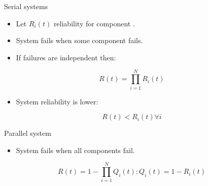 \begin{frame}[t]{Serial systems}
\begin{itemize}
  \item Let $R_i(t)$ reliability for component .
  \item System fails when some component fails.
\end{itemize}
\begin{center}

\end{center}
\begin{itemize}
  \item If failures are independent then:
\end{itemize}
\begin{equation*}
R(t) = \prod_{i=1}^{N} R_i(t)
\end{equation*}
\begin{itemize}
  \item System reliability is lower:
\end{itemize}
\begin{equation*}
R(t) < R_i(t) \forall i
\end{equation*}
\end{frame}

\begin{frame}[t]{Parallel system}
\begin{itemize}
  \item System fails when all components fail.
\end{itemize}
\begin{equation*}
R(t) = 1 - \prod_{i=1}^N Q_i(t) : Q_i(t) = 1 - R_i(t)
\end{equation*}
\begin{center}

\end{center}
\end{frame}

